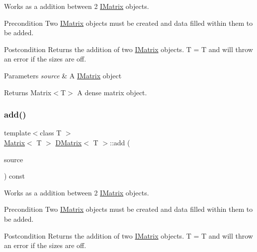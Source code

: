 Works as a addition between 2 \mbox{\hyperlink{class_i_matrix}{I\+Matrix}} objects. 

\begin{DoxyPrecond}{Precondition}
Two \mbox{\hyperlink{class_i_matrix}{I\+Matrix}} objects must be created and data filled within them to be added. 
\end{DoxyPrecond}
\begin{DoxyPostcond}{Postcondition}
Returns the addition of two \mbox{\hyperlink{class_i_matrix}{I\+Matrix}} objects. T = T and will throw an error if the sizes are off.
\end{DoxyPostcond}

\begin{DoxyParams}{Parameters}
{\em source} & A \mbox{\hyperlink{class_i_matrix}{I\+Matrix}} object \\
\hline
\end{DoxyParams}
\begin{DoxyReturn}{Returns}
Matrix$<$\+T$>$ A dense matrix object. 
\end{DoxyReturn}
\mbox{\label{class_d_matrix_a601ee8112f88b1fb6397fef3bb2e9140}} 
\subsubsection{\texorpdfstring{add()}{add()}\hspace{0.1cm}{\footnotesize\ttfamily [4/6]}}
{\footnotesize\ttfamily template$<$class T $>$ \\
\mbox{\hyperlink{class_matrix}{Matrix}}$<$ T $>$ \mbox{\hyperlink{class_d_matrix}{D\+Matrix}}$<$ T $>$\+::add (\begin{DoxyParamCaption}\item[{const \mbox{\hyperlink{class_i_matrix}{I\+Matrix}}$<$ \mbox{\hyperlink{class_u_matrix}{U\+Matrix}}$<$ T $>$, T $>$ \&}]{source }\end{DoxyParamCaption}) const}



Works as a addition between 2 \mbox{\hyperlink{class_i_matrix}{I\+Matrix}} objects. 

\begin{DoxyPrecond}{Precondition}
Two \mbox{\hyperlink{class_i_matrix}{I\+Matrix}} objects must be created and data filled within them to be added. 
\end{DoxyPrecond}
\begin{DoxyPostcond}{Postcondition}
Returns the addition of two \mbox{\hyperlink{class_i_matrix}{I\+Matrix}} objects. T = T and will throw an error if the sizes are off.
\end{DoxyPostcond}

